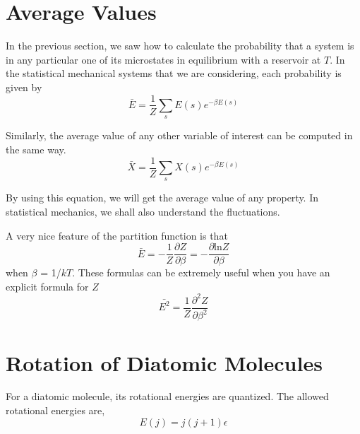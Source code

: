 
\section{Average Values}
In the previous section, we saw how to calculate the probability that a system is in any particular one of its
microstates in equilibrium with a reservoir at $T$. In the statistical mechanical systems that we are considering,
each probability is given by 
\begin{equation}
\bar{E} = \frac{1}{Z} \sum_s E(s)e^{-\beta E(s)}
\end{equation}

Similarly, the average value of any other variable of interest can be computed in the same way.
\begin{equation}
\bar{X} = \frac{1}{Z} \sum_s X(s)e^{-\beta E(s)}
\end{equation}

By using this equation, we will get the average value of any property. In statistical mechanics, we shall also
understand the fluctuations.

A very nice feature of the partition function is that 
\begin{equation}
\bar{E} = -\frac{1}{Z} \frac{\partial{Z}}{\partial{\beta}} = -\frac{\partial{\text{ln}Z}}{\partial {\beta}}
\end{equation}
when $\beta$ = 1/$kT$. These formulas can be extremely useful when you have an explicit formula for $Z$
\begin{equation}
\bar{E^2} = \frac{1}{Z} \frac{\partial^2{Z}}{\partial{\beta^2}} 
\end{equation}


\section{Rotation of Diatomic Molecules}
For a diatomic molecule, its rotational energies are quantized. The allowed rotational energies are,
\begin{equation}
E(j) = j(j+1)\epsilon
\end{equation}

